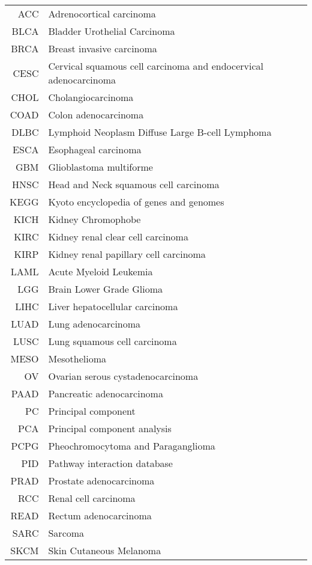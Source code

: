 \documentclass[
  parskip,
  oneside]{scrreprt}
\begin{document}
\begin{tabular}{rl}
        ACC & Adrenocortical carcinoma\\
        BLCA & Bladder Urothelial Carcinoma\\
        BRCA & Breast invasive carcinoma\\
        CESC & Cervical squamous cell carcinoma and endocervical adenocarcinoma\\
        CHOL & Cholangiocarcinoma\\
        COAD & Colon adenocarcinoma\\
      DLBC & Lymphoid Neoplasm Diffuse Large B-cell Lymphoma\\
      ESCA & Esophageal carcinoma\\
      GBM & Glioblastoma multiforme\\
      HNSC & Head and Neck squamous cell carcinoma\\
      KEGG & Kyoto encyclopedia of genes and genomes\\
      KICH & Kidney Chromophobe\\
      KIRC & Kidney renal clear cell carcinoma\\
      KIRP & Kidney renal papillary cell carcinoma\\
      LAML & Acute Myeloid Leukemia\\
      LGG    & Brain Lower Grade Glioma\\
      LIHC & Liver hepatocellular carcinoma\\
      LUAD & Lung adenocarcinoma\\
      LUSC & Lung squamous cell carcinoma\\
      MESO & Mesothelioma\\
      OV & Ovarian serous cystadenocarcinoma\\
      PAAD & Pancreatic adenocarcinoma\\
      PC & Principal component\\
      PCA & Principal component analysis\\
      PCPG & Pheochromocytoma and Paraganglioma\\
      PID & Pathway interaction database\\
      PRAD & Prostate adenocarcinoma\\
      RCC & Renal cell carcinoma\\
      READ & Rectum adenocarcinoma\\
      SARC & Sarcoma\\
      SKCM & Skin Cutaneous Melanoma\\

\end{tabular}
\end{document}
